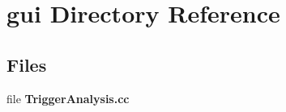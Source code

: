 \section{gui Directory Reference}
\label{dir_b70f274d6d8f827d5f69e383a4610cc6}
\subsection*{Files}
\begin{DoxyCompactItemize}
\item 
file {\bfseries Trigger\-Analysis.\-cc}
\end{DoxyCompactItemize}

